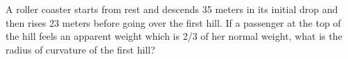 A roller coaster starts from rest and descends 35 meters in its
initial drop and then rises 23 meters before going over the first
hill. If a passenger at the top of the hill feels an apparent weight
which is 2/3 of her normal weight, what is the radius of curvature of
the first hill?
